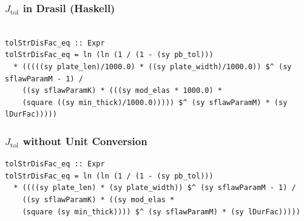 \documentclass{beamer}
\begin{document}

\begin{frame}

\frametitle{$J_{\mbox{tol}}$ in Drasil (Haskell)}

\begin{lstlisting}

tolStrDisFac_eq :: Expr
tolStrDisFac_eq = ln (ln (1 / (1 - (sy pb_tol)))
  * (((((sy plate_len)/1000.0) * ((sy plate_width)/1000.0)) $^ (sy sflawParamM - 1) / 
    ((sy sflawParamK) * (((sy mod_elas * 1000.0) *
    (square ((sy min_thick)/1000.0))))) $^ (sy sflawParamM) * (sy lDurFac)))))

\end{lstlisting}
\end{frame}


\begin{frame}

\frametitle{$J_{\mbox{tol}}$ without Unit Conversion}

\begin{lstlisting}
tolStrDisFac_eq :: Expr
tolStrDisFac_eq = ln (ln (1 / (1 - (sy pb_tol)))
  * ((((sy plate_len) * (sy plate_width)) $^ (sy sflawParamM - 1) / 
    ((sy sflawParamK) * ((sy mod_elas *
    (square (sy min_thick)))) $^ (sy sflawParamM) * (sy lDurFac)))))
\end{lstlisting}
\end{frame}

\end{document}
